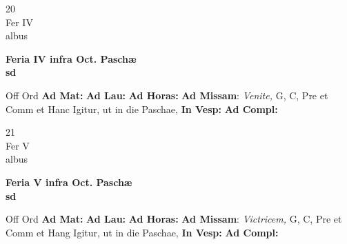 \documentclass[10pt, openany]{book}
\begin{document}
        \begin{center}
            \begin{minipage}{3.5in}
                \vspace{2em}
                \begin{minipage}{0.5in}
                    {\Huge 20} \\
                    {\normalsize Fer IV} \\
                    {\normalsize albus}
                \end{minipage}
                \begin{minipage}{3.0in}
                    \textbf{ \large Feria IV infra Oct. Paschæ \\
                    \textnormal{\normalsize sd}} \\ 
                \end{minipage}
                \begin{justify}Off Ord
                    \textbf{Ad Mat: }
                    \textbf{Ad Lau: }
                    \textbf{Ad Horas: }\textbf{Ad Missam}: \textit{Venite,} G, C, Pre et Comm et Hanc Igitur, ut in die Paschae,  
                    \textbf{In Vesp: }
                    \textbf{Ad Compl: }
                \end{justify}
            \end{minipage}
        \end{center}
    
        \begin{center}
            \begin{minipage}{3.5in}
                \vspace{2em}
                \begin{minipage}{0.5in}
                    {\Huge 21} \\
                    {\normalsize Fer V} \\
                    {\normalsize albus}
                \end{minipage}
                \begin{minipage}{3.0in}
                    \textbf{ \large Feria V infra Oct. Paschæ \\
                    \textnormal{\normalsize sd}} \\ 
                \end{minipage}
                \begin{justify}Off Ord
                    \textbf{Ad Mat: }
                    \textbf{Ad Lau: }
                    \textbf{Ad Horas: }\textbf{Ad Missam}: \textit{Victricem,} G, C, Pre et Comm et Hang Igitur, ut in die Paschae,  
                    \textbf{In Vesp: }
                    \textbf{Ad Compl: }
                \end{justify}
            \end{minipage}
        \end{center}
    
\end{document}
